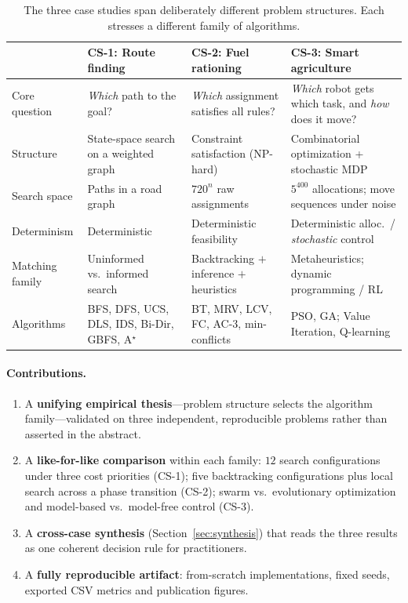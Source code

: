 \documentclass[10pt]{article}
\let\akparagraph\paragraph
\renewcommand{\paragraph}[1]{\Needspace*{4\baselineskip}\akparagraph{#1}}
\begin{document}
\begin{table}[t]
\centering
\caption{The three case studies span deliberately different problem structures.
Each stresses a different family of algorithms.}
\label{tab:overview}
\small
\renewcommand{\arraystretch}{1.25}
\begin{tabular}{@{}p{2.7cm} p{3.3cm} p{4.3cm} p{4.1cm}@{}}
\toprule
& \textbf{CS-1: Route finding} & \textbf{CS-2: Fuel rationing} & \textbf{CS-3: Smart agriculture} \\
\midrule
Core question & \emph{Which} path to the goal? & \emph{Which} assignment satisfies all rules? & \emph{Which} robot gets which task, and \emph{how} does it move? \\
Structure & State-space search on a weighted graph & Constraint satisfaction (NP-hard) & Combinatorial optimization + stochastic MDP \\
Search space & Paths in a road graph & $720^{n}$ raw assignments & $5^{400}$ allocations; move sequences under noise \\
Determinism & Deterministic & Deterministic feasibility & Deterministic alloc.\ / \emph{stochastic} control \\
Matching family & Uninformed vs.\ informed search & Backtracking $+$ inference $+$ heuristics & Metaheuristics; dynamic programming / RL \\
Algorithms & BFS, DFS, UCS, DLS, IDS, Bi-Dir, GBFS, A$^\star$ & BT, MRV, LCV, FC, AC-3, min-conflicts & PSO, GA; Value Iteration, Q-learning \\
\bottomrule
\end{tabular}
\end{table}

\paragraph{Contributions.}
\begin{enumerate}[leftmargin=1.4em,itemsep=1pt]
\item A \textbf{unifying empirical thesis}---problem structure selects the
algorithm family---validated on three independent, reproducible problems rather
than asserted in the abstract.
\item A \textbf{like-for-like comparison} within each family: $12$ search
configurations under three cost priorities (CS-1); five backtracking
configurations plus local search across a phase transition (CS-2); swarm vs.\
evolutionary optimization and model-based vs.\ model-free control (CS-3).
\item A \textbf{cross-case synthesis} (Section~\ref{sec:synthesis}) that reads
the three results as one coherent decision rule for practitioners.
\item A \textbf{fully reproducible artifact}: from-scratch implementations,
fixed seeds, exported CSV metrics and publication figures.
\end{enumerate}
\end{document}
